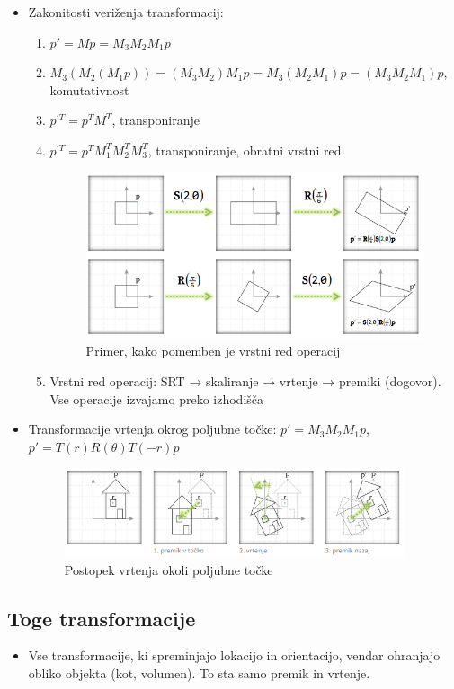 \documentclass{article}
\begin{document}
\begin{itemize}
    \item Zakonitosti veriženja transformacij:
    \begin{enumerate}
        \item $p' = Mp = M_3M_2M_1p$
        \item $M_3(M_2(M_1p)) = (M_3M_2)M_1p = M_3(M_2M_1)p = (M_3M_2M_1)p$, komutativnost
        \item $p^{'T} = p^TM^T$, transponiranje
        \item $p^{'T} = p^TM_1^TM_2^TM_3^T$, transponiranje, obratni vrstni red
        \begin{figure}[H]
        \centering
        \includegraphics[width=100mm]{src/vrstni_red_verizenja.png}
        \caption{Primer, kako pomemben je vrstni red operacij}
        \end{figure} 
        \item Vrstni red operacij: SRT → skaliranje → vrtenje → premiki (dogovor). Vse operacije izvajamo preko izhodišča
    \end{enumerate}
    \item Transformacije vrtenja okrog poljubne točke: $p' = M_3M_2M_1p$, $p' = T(r)R(\theta)T(-r)p$
        \begin{figure}[H]
        \centering
        \includegraphics[width=100mm]{src/vrtenje_okrog_poljubne_tocke.png}
        \caption{Postopek vrtenja okoli poljubne točke}
        \end{figure} 
\end{itemize}

\subsection{Toge transformacije}
\begin{itemize}
    \item Vse transformacije, ki spreminjajo lokacijo in orientacijo, vendar ohranjajo obliko objekta (kot, volumen). To sta samo premik in vrtenje.
\end{itemize}
\end{document}
